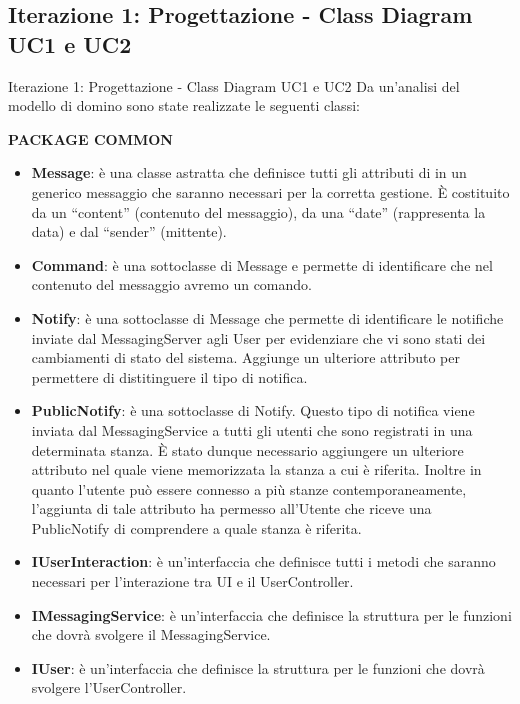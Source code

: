 \subsection{Iterazione 1: Progettazione - Class Diagram UC1 e UC2}
 \begin{frame} [allowframebreaks] {Iterazione 1: Progettazione - Class Diagram UC1 e UC2}
   Da un'analisi del modello di domino sono state realizzate le seguenti classi:  
  \newline
  \centerline{\textbf{PACKAGE COMMON}}
  \begin{itemize}
   \item \textbf{Message}: è una classe astratta che definisce tutti gli attributi di in un generico messaggio che saranno necessari per la corretta gestione.
                 È costituito da un ``content'' (contenuto del messaggio), da una ``date'' (rappresenta la data) e dal ``sender'' (mittente).
   \item \textbf{Command}: è una sottoclasse di Message e permette di identificare che nel contenuto del messaggio avremo un comando.
   \item \textbf{Notify}: è una sottoclasse di Message che permette di identificare le notifiche inviate dal MessagingServer agli User per evidenziare che vi sono 
          stati dei cambiamenti di stato del sistema. Aggiunge un ulteriore attributo per permettere di distitinguere il tipo di notifica.
   \item \textbf{PublicNotify}: è una sottoclasse di Notify. Questo tipo di notifica viene inviata dal MessagingService a tutti gli utenti che sono registrati in una 
         determinata stanza. È stato dunque necessario aggiungere un ulteriore attributo nel quale viene memorizzata la stanza a cui è riferita. Inoltre in quanto 
         l'utente può essere connesso a più stanze contemporaneamente, l'aggiunta di tale attributo ha permesso all'Utente che riceve una PublicNotify di comprendere 
         a quale stanza è riferita.
   \item \textbf{IUserInteraction}: è un'interfaccia che definisce tutti i metodi che saranno necessari per l'interazione tra UI e il UserController.
   \item \textbf{IMessagingService}: è un'interfaccia che definisce la struttura per le funzioni che dovrà svolgere il MessagingService.
   \item \textbf{IUser}: è un'interfaccia che definisce la struttura per le funzioni che dovrà svolgere l'UserController.
  \end{itemize} 
 \end{frame}

